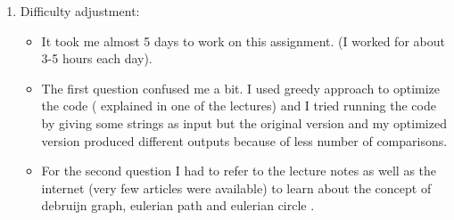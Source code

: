 \documentclass[11pt, oneside]{article}   	%
\begin{document}
\begin{enumerate}
\begin{enumerate}[label={2.\arabic*}]
 

\end{enumerate}

\item Difficulty adjustment: 
\begin{itemize}
\item It took me almost 5 days to work on this assignment. (I worked for about 3-5 hours each day). 

\item The first question confused me a bit. I used greedy approach to optimize the code ( explained in one of the lectures) and I tried running the code by giving some strings as input but the original version and my optimized version produced different outputs because of less number of comparisons. 

\item For the second question I had to refer to the lecture notes as well as the internet (very few articles were available) to learn about the concept of debruijn graph, eulerian path and eulerian circle .


\end{itemize}



\end{enumerate}
\end{document}
